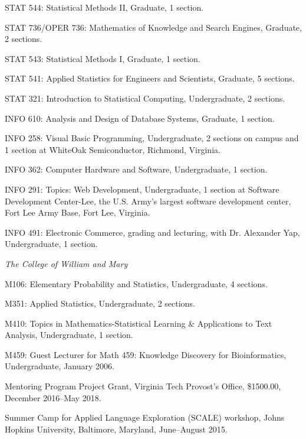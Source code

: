 \documentclass[11pt,article,oneside]{memoir}
\begin{document}
\ind STAT 544: Statistical Methods II, Graduate, 1 section.

\ind STAT 736/OPER 736: Mathematics of Knowledge and Search Engines, Graduate, 2 sections.

\ind STAT 543: Statistical Methods I, Graduate, 1 section.

\ind STAT 541: Applied Statistics for Engineers and Scientists, Graduate, 5 sections.

\ind STAT 321: Introduction to Statistical Computing, Undergraduate, 2 sections.

\ind INFO 610: Analysis and Design of Database Systems, Graduate, 1 section.

\ind INFO 258: Visual Basic Programming, Undergraduate, 2 sections on campus and 1 section at WhiteOak Semiconductor, Richmond, Virginia.

\ind INFO 362: Computer Hardware and Software, Undergraduate, 1 section.

\ind INFO 291: Topics: Web Development, Undergraduate, 1 section at Software Development Center-Lee, the U.S. Army’s largest software development center, Fort Lee Army Base, Fort Lee, Virginia.

\ind INFO 491: Electronic Commerce, grading and lecturing, with Dr. Alexander Yap, Undergraduate, 1 section. 



\bigskip

\noindent\emph{The College of William and Mary \vspace{0.05in}}

\ind M106: Elementary Probability and Statistics, Undergraduate, 4 sections.

\ind M351: Applied Statistics, Undergraduate, 2 sections.

\ind M410: Topics in Mathematics-Statistical Learning \& Applications to Text Analysis, Undergraduate, 1 section.

\ind M459: Guest Lecturer for Math 459: Knowledge Discovery for Bioinformatics, Undergraduate, January 2006.

\bigskip


\ind Mentoring Program Project Grant, Virginia Tech Provost's Office, \$1500.00, December 2016--May 2018.

\ind Summer Camp for Applied Language Exploration (SCALE) workshop, Johns Hopkins University, Baltimore, Maryland, June--August 2015.
\end{document}
